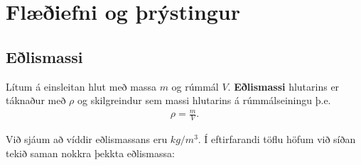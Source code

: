 \ifdefined \wholebook \else\documentclass[oneside]{book}\usepackage{EdlBook}\graphicspath{{figures/}}
\begin{document}
%
\setcounter{chapter}{9} %
%
\fi

\renewcommand{\thefigure}{\arabic{figure}}


\chapter{Flæðiefni og þrýstingur}

\section{Eðlismassi}

\begin{tcolorbox}
\begin{definition}
Lítum á einsleitan hlut með massa $m$ og rúmmál $V$. \textbf{Eðlismassi} hlutarins er táknaður með $\rho$ og skilgreindur sem massi hlutarins á rúmmálseiningu þ.e.
\begin{align*}
    \rho = \frac{m}{V}.
\end{align*}
\end{definition}
\end{tcolorbox}

Við sjáum að víddir eðlismassans eru $\si{kg/m^3}$. Í eftirfarandi töflu höfum við síðan tekið saman nokkra þekkta eðlismassa:
\end{document}
